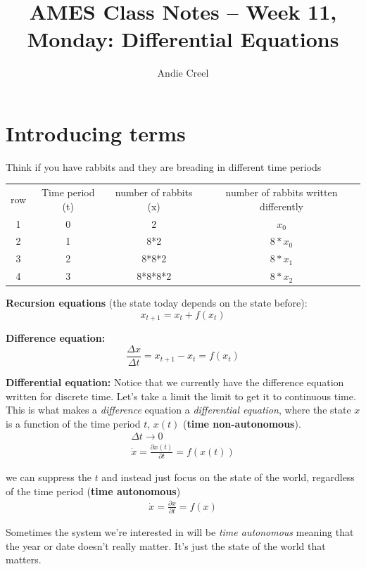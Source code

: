 \documentclass{article}
\title{AMES Class Notes -- Week 11, Monday: Differential Equations}
\author{Andie Creel}
\begin{document}
\maketitle

\section{Introducing terms}
Think if you have rabbits and they are breading in different time periods 

\begin{center}
    \begin{tabular}{ c c c c}
     row & Time period (t) & number of rabbits (x) & number of rabbits written differently \\
     1 & 0 & 2 & $x_0$\\ 
     2 & 1 & 8*2 & $8* x_0$\\  
     3 & 2 & 8*8*2 & $8*x_1$  \\
     4 & 3 & 8*8*8*2 & $8* x_2$
    \end{tabular}
\end{center}

\textbf{Recursion equations }(the state today depends on the state before): 
\[x_{t+1} = x_t + f(x_t)\]

\textbf{Difference equation: }
\[\frac{\Delta x}{\Delta t} = x_{t+1} - x_t = f(x_t)\]

\textbf{Differential equation:} Notice that we currently have the difference equation written for discrete time. Let's take a limit the limit to get it to continuous time. This is what makes a \textit{difference} equation a \textit{differential equation}, where the state $x$ is a function of the time period $t$, $x(t)$ (\textbf{time non-autonomous}). 
\begin{align*}
    \Delta t \rightarrow 0\\
    \dot x = \frac{\partial x(t)}{\partial t} = f(x(t))
\end{align*}

we can suppress the $t$ and instead just focus on the state of the world, regardless of the time period (\textbf{time autonomous})
\begin{align*}
    \dot x = \frac{\partial x}{\partial t} = f(x)
\end{align*}

Sometimes the system we're interested in will be \textit{time autonomous} meaning that the year or date doesn't really matter. It's just the state of the world that matters. \\
\end{document}
